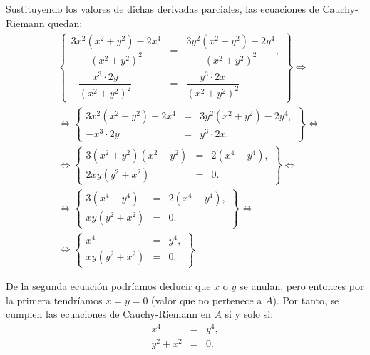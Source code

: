 \begin{ejercicio}
\begin{enumerate}
\begin{itemize}
            Sustituyendo los valores de dichas derivadas parciales, las ecuaciones de Cauchy-Riemann quedan:
            \begin{align*}
                &\left\{
                    \begin{array}{rcl}
                        \dfrac{3x^2(x^2+y^2)-2x^4}{(x^2+y^2)^2} &=& \dfrac{3y^2(x^2+y^2)-2y^4}{(x^2+y^2)^2},\\
                        -\dfrac{x^3\cdot 2y}{(x^2+y^2)^2} &=& \dfrac{y^3\cdot 2x}{(x^2+y^2)^2}
                    \end{array}
                \right\}
                \iff\\&\iff
                \left\{
                    \begin{array}{rcl}
                        3x^2(x^2+y^2)-2x^4 &=& 3y^2(x^2+y^2)-2y^4,\\
                        -x^3\cdot 2y &=& y^3\cdot 2x.
                    \end{array}
                \right\}
                \iff\\&\iff
                \left\{
                    \begin{array}{rcl}
                        3(x^2+y^2)(x^2-y^2)&=& 2(x^4-y^4),\\
                        2xy(y^2+x^2)&=& 0.
                    \end{array}
                \right\}
                \iff\\&\iff
                \left\{
                    \begin{array}{rcl}
                        3(x^4-y^4)&=& 2(x^4-y^4),\\
                        xy(y^2+x^2)&=& 0.
                    \end{array}
                \right\}
                \iff\\&\iff
                \left\{
                    \begin{array}{rcl}
                        x^4&=&y^4,\\
                        xy(y^2+x^2)&=& 0.
                    \end{array}
                \right\}
            \end{align*}

            De la segunda ecuación podríamos deducir que $x$ o $y$ se anulan, pero entonces por la primera tendríamos $x=y=0$ (valor que no pertenece a $A$). Por tanto, se cumplen las ecuaciones de Cauchy-Riemann en $A$ si y solo si:
            \begin{equation*}
                \begin{array}{rcl}
                    x^4&=&y^4,\\
                    y^2+x^2&=& 0.
                \end{array}
            \end{equation*}
            

\end{itemize}
\end{enumerate}
\end{ejercicio}
